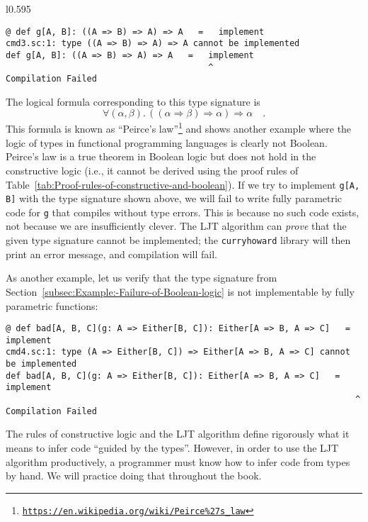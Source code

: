 \begin{wrapfigure}{l}{0.595\columnwidth}%
\vspace{-0.95\baselineskip}
\begin{lstlisting}
@ def g[A, B]: ((A => B) => A) => A   =   implement
cmd3.sc:1: type ((A => B) => A) => A cannot be implemented
def g[A, B]: ((A => B) => A) => A   =   implement
                                        ^
Compilation Failed
\end{lstlisting}

\vspace{-0.7\baselineskip}
\end{wrapfigure}%

\noindent The logical formula corresponding to this type signature
is \vspace{-0\baselineskip}
\begin{equation}
\forall(\alpha,\beta).\,\left(\left(\alpha\Rightarrow\beta\right)\Rightarrow\alpha\right)\Rightarrow\alpha\quad.\label{eq:ch-example-3-peirce-law}
\end{equation}
This formula is known as \textsf{``}Peirce\textsf{'}s law\textsf{''}\footnote{\texttt{\href{https://en.wikipedia.org/wiki/Peirce\%27s_law}{https://en.wikipedia.org/wiki/Peirce\%27s\_law}}}
and shows another example where the logic of types in functional programming
languages is clearly not Boolean. Peirce\textsf{'}s law is a true theorem in
Boolean logic but does not hold in the constructive logic (i.e., it
cannot be derived using the proof rules of Table~\ref{tab:Proof-rules-of-constructive-and-boolean}).
If we try to implement \lstinline!g[A, B]! with the type signature
shown above, we will fail to write fully parametric code for \lstinline!g!
that compiles without type errors. This is because no such code exists,
\textemdash{} not because we are insufficiently clever. The LJT algorithm
can \emph{prove} that the given type signature cannot be implemented;
the \texttt{curryhoward} library will then print an error message,
and compilation will fail.

As another example, let us verify that the type signature from Section~\ref{subsec:Example:-Failure-of-Boolean-logic}
is not implementable by fully parametric functions:
\begin{lstlisting}
@ def bad[A, B, C](g: A => Either[B, C]): Either[A => B, A => C]   =   implement
cmd4.sc:1: type (A => Either[B, C]) => Either[A => B, A => C] cannot be implemented
def bad[A, B, C](g: A => Either[B, C]): Either[A => B, A => C]   =   implement
                                                                     ^
Compilation Failed
\end{lstlisting}
The rules of constructive logic and the LJT algorithm define rigorously
what it means to infer code \textsf{``}guided by the types\textsf{''}. However, in
order to use the LJT algorithm productively, a programmer must know
how to infer code from types by hand. We will practice doing that
throughout the book.

